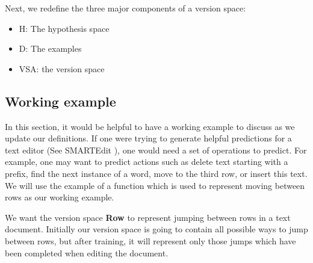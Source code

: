 \documentclass{article}
\theoremstyle{definition}
\begin{document}
%
%
Next, we redefine the three major components of a version space: 
\begin{itemize}
    \item H: The hypothesis space
    \item D: The examples
    \item VSA: the version space
\end{itemize}
\subsection{Working example}
In this section, it would be helpful to have a working example to discuss as we update our definitions. If one were trying to generate helpful predictions for a text editor (See SMARTEdit \cite{short}), one would need a set of operations to predict. For example, one may want to predict actions such as delete text starting with a prefix, find the next instance of a word, move to the third row, or insert this text. We will use the example of a function which is used to represent moving between rows as our working example. 

We want the version space \textbf{Row} to represent jumping between rows in a text document. Initially our version space is going to contain all possible ways to jump between rows, but after training, it will represent only those jumps which have been completed when editing the document. 
\end{document}
